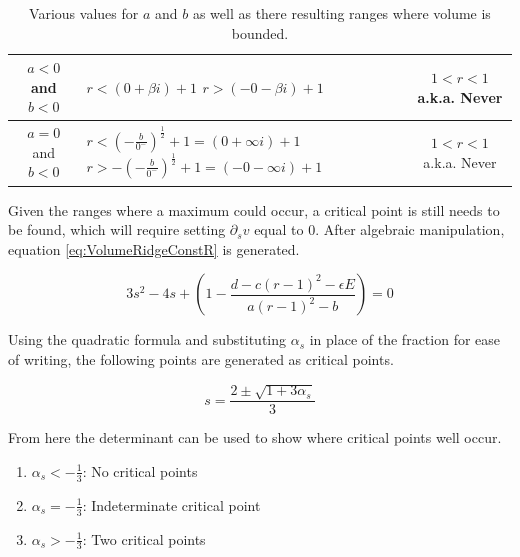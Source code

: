 \begin{table}[h]
\begin{tabular}{c|p{6cm}|c}
        $a<0$ and $b<0$
        &
        $r< (0+\beta i)+1$
        \newline
        $r> (-0-\beta i)+1$
        &
        $1<r<1$ a.k.a. Never
        \\
        \hline
        
        $a=0$ and $b<0$
        &
        $r< \left(-\frac{b}{0^-}\right)^\frac{1}{2}+1=(0+\infty i)+1$
        \newline
        $r> -\left(-\frac{b}{0^-}\right)^\frac{1}{2}+1=(-0-\infty i)+1$
        &
        $1<r<1$ a.k.a. Never
        \\
    \end{tabular}
    \caption{Various values for $a$ and $b$ as well as there resulting ranges where volume is bounded.}
    \label{tab:BoundedVolumeRanges}
\end{table}

Given the ranges where a maximum could occur, a critical point is still needs to be found, which will require setting $\partial_sv$ equal to $0$. After algebraic manipulation, equation \ref{eq:VolumeRidgeConstR} is generated.

\begin{equation}
    \label{eq:VolumeRidgeConstR}
    3s^2-4s+\left( 1-\frac{d-c(r-1)^2-\epsilon E}{a(r-1)^2-b} \right)=0
\end{equation}

 Using the quadratic formula and substituting $\alpha_s$ in place of the fraction for ease of writing, the following points are generated as critical points.
 
\begin{equation*}
    s=\frac{2\pm \sqrt{1+3\alpha_s}}{3}
\end{equation*}

From here the determinant can be used to show where critical points well occur.

\begin{enumerate}
    \item $\alpha_s < -\frac{1}{3}$: No critical points
    \item $\alpha_s = -\frac{1}{3}$: Indeterminate critical point
    \item $\alpha_s > -\frac{1}{3}$: Two critical points
\end{enumerate}

